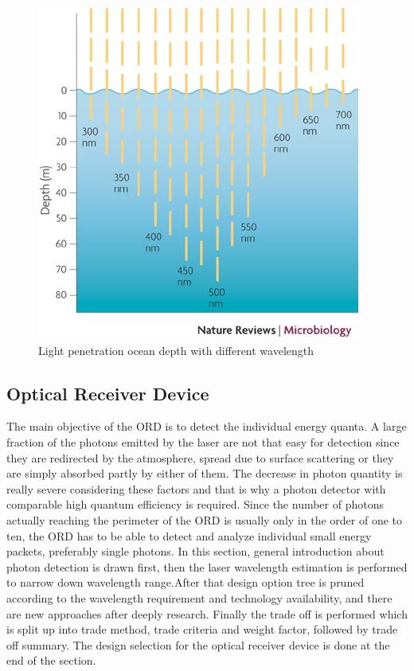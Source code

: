 \begin{figure}[ht!]
\centering
\includegraphics[scale = 0.7]{chapters/img/Ocean_absorption.jpg}
\caption{Light penetration ocean depth with different wavelength}
\label{fig:intro_ocean_penetrate}
\end{figure}

\subsection{Optical Receiver Device}
\label{TOORD}
The main objective of the \ac{ORD} is to detect the individual energy quanta. A large fraction of the photons emitted by the \acs{laser} are not that easy for detection since they are redirected by the atmosphere, spread due to surface scattering or they are simply absorbed partly by either of them. The decrease in photon quantity is really severe considering these factors and that is why a photon detector with comparable high quantum efficiency is required. Since the number of photons actually reaching the perimeter of the \ac{ORD} is usually only in the order of one to ten, the \acs{ORD} has to be able to detect and analyze individual small energy packets, preferably single photons. In this section, general introduction about photon detection is drawn first, then the \acs{laser} wavelength estimation is performed to narrow down wavelength range.After that design option tree is pruned according to the wavelength requirement and technology availability, and there are new approaches after deeply research. Finally the trade off is performed which is split up into trade method, trade criteria and weight factor, followed by trade off summary. The design selection for the optical receiver device is done at the end of the section.

